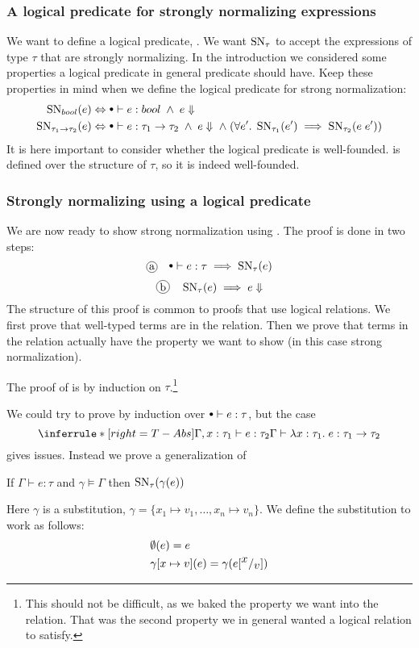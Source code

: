 \subsubsection*{A logical predicate for strongly normalizing expressions}
We want to define a logical predicate, . We want $\operatorname{SN}_\tau$ to accept the expressions of type $\tau$ that are strongly normalizing. In the introduction we considered some properties a logical predicate in general predicate should have. Keep these properties in mind when we define the logical predicate for strong normalization:
\begin{align*}
  \SN{bool}{e} & \Leftrightarrow \mtenv \vdash e : bool \pand e \Downarrow \\
  \SN{\tarrow{\tau_1}{\tau_2}}{e} & \Leftrightarrow \mtenv \vdash e : \tarrow{\tau_1}{\tau_2} \pand e \Downarrow \pand (\forall e'. \; \SN{\tau_1}{e'} \implies \SN{\tau_2}{e \; e'})\\
\end{align*}
It is here important to consider whether the logical predicate is well-founded.  is defined over the structure of $\tau$, so it is indeed well-founded.
\subsubsection*{Strongly normalizing using a logical predicate}
We are now ready to show strong normalization using . The proof is done in two steps:
\[
\circled{a} \quad \mtenv \vdash e : \tau \implies \SN{\tau}{e}
\]
\[
\circled{b} \quad \SN{\tau}{e} \implies e \Downarrow
\]
The structure of this proof is common to proofs that use logical relations. We first prove that well-typed terms are in the relation. Then we prove that terms in the relation actually have the property we want to show (in this case strong normalization).

The proof of  is by induction on $\tau$.\footnote{This should not be difficult, as we baked the property we want into the relation. That was the second property we in general wanted a logical relation to satisfy.}

We could try to prove  by induction over $\mtenv \vdash e : \tau$, but the case
\[
  \TAbs
\]
gives issues. Instead we prove a generalization of 
\begin{astrnorm}
  If $\Gamma \vdash e : \tau$ and $\gamma \models \Gamma$ then $\operatorname{SN}_{\tau}(\gamma(e))$
\end{astrnorm}
Here $\gamma$ is a substitution, $\gamma = \{x_1 \mapsto v_1, \dots , x_n \mapsto v_n\}$. We define the substitution to work as follows:
\begin{align*}
  & \emptyset (e) = e \\
  & \gamma \lbrack x \mapsto v \rbrack(e) = \gamma(e[^{\textstyle x}/_{\textstyle v}])
\end{align*}

